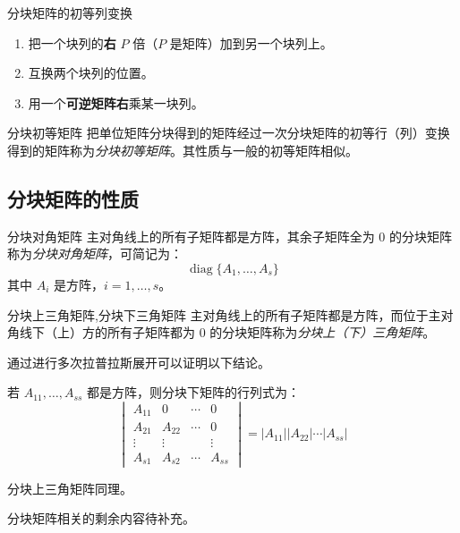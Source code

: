 \begin{definition}{分块矩阵的初等列变换}
	\begin{enumerate}
		\item 把一个块列的\textbf{右} $P$ 倍（$P$ 是矩阵）加到另一个块列上。
		\item 互换两个块列的位置。
		\item 用一个\textbf{可逆矩阵右}乘某一块列。
	\end{enumerate}
\end{definition}

\begin{definition}{分块初等矩阵}
	把单位矩阵分块得到的矩阵经过一次分块矩阵的初等行（列）变换得到的矩阵称为\emph{分块初等矩阵}。其性质与一般的初等矩阵相似。
\end{definition}

\subsection{分块矩阵的性质}

\begin{definition}{分块对角矩阵}
	主对角线上的所有子矩阵都是方阵，其余子矩阵全为 $0$ 的分块矩阵称为\emph{分块对角矩阵}，可简记为：
	$$
	\operatorname{diag} \{A_1, \ldots, A_s\}
	$$
	其中 $A_i$ 是方阵，$i = 1, \ldots, s$。
\end{definition}

\begin{definition}{分块上三角矩阵,分块下三角矩阵}
	主对角线上的所有子矩阵都是方阵，而位于主对角线下（上）方的所有子矩阵都为 $0$ 的分块矩阵称为\emph{分块上（下）三角矩阵}。
\end{definition}

通过进行多次拉普拉斯展开可以证明以下结论。

\begin{theorem}[分块三角矩阵的行列式]
	若 $A_{11}, \ldots, A_{ss}$ 都是方阵，则分块下矩阵的行列式为：
	$$
	\begin{vmatrix}
		A_{11} & 0 & \cdots & 0
		\\
		A_{21} & A_{22} & \cdots & 0
		\\
		\vdots & \vdots & & \vdots
		\\
		A_{s1} & A_{s2} & \cdots & A_{ss}
	\end{vmatrix}
	= |A_{11}| |A_{22}| \cdots |A_{ss}|
	$$

	分块上三角矩阵同理。
\end{theorem}


分块矩阵相关的剩余内容待补充。